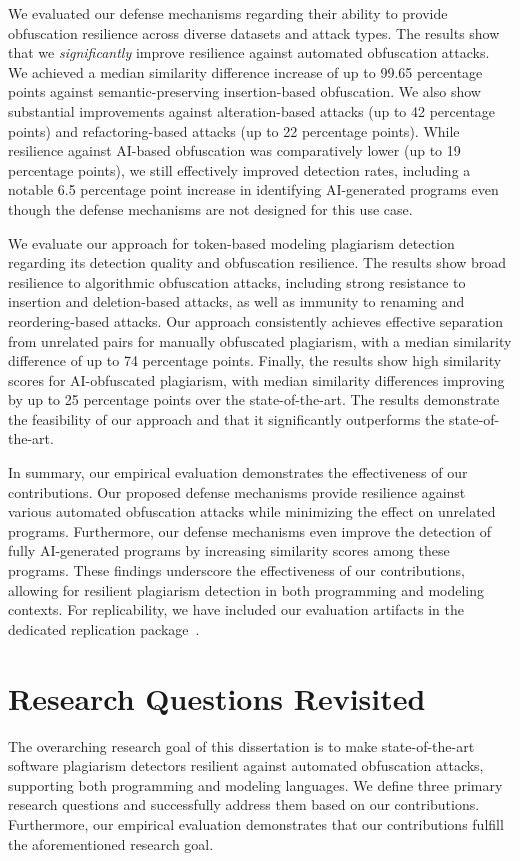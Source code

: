 We evaluated our defense mechanisms regarding their ability to provide obfuscation resilience across diverse datasets and attack types.
The results show that we \textit{significantly} improve resilience against automated obfuscation attacks.
We achieved a median similarity difference increase of up to 99.65 percentage points against semantic-preserving insertion-based obfuscation. We also show substantial improvements against alteration-based attacks (up to 42 percentage points) and refactoring-based attacks (up to 22 percentage points). While resilience against AI-based obfuscation was comparatively lower (up to 19 percentage points), we still effectively improved detection rates, including a notable 6.5 percentage point increase in identifying AI-generated programs even though the defense mechanisms are not designed for this use case.

We evaluate our approach for token-based modeling plagiarism detection regarding its detection quality and obfuscation resilience.
The results show broad resilience to algorithmic obfuscation attacks, including strong resistance to insertion and deletion-based attacks, as well as immunity to renaming and reordering-based attacks.
Our approach consistently achieves effective separation from unrelated pairs for manually obfuscated plagiarism, with a median similarity difference of up to 74 percentage points.
Finally, the results show high similarity scores for AI-obfuscated plagiarism, with median similarity differences improving by up to 25 percentage points over the state-of-the-art.
The results demonstrate the feasibility of our approach and that it significantly outperforms the state-of-the-art.

In summary, our empirical evaluation demonstrates the effectiveness of our contributions.
Our proposed defense mechanisms provide resilience against various automated obfuscation attacks while minimizing the effect on unrelated programs. Furthermore, our defense mechanisms even improve the detection of fully AI-generated programs by increasing similarity scores among these programs.
%
These findings underscore the effectiveness of our contributions, allowing for resilient plagiarism detection in both programming and modeling contexts. For replicability, we have included our evaluation artifacts in the dedicated replication package~.

\section{Research Questions Revisited}
The overarching research goal of this dissertation is to make state-of-the-art software plagiarism detectors resilient against automated obfuscation attacks, supporting both programming and modeling languages.
We define three primary research questions and successfully address them based on our contributions. Furthermore, our empirical evaluation demonstrates that our contributions fulfill the aforementioned research goal.

